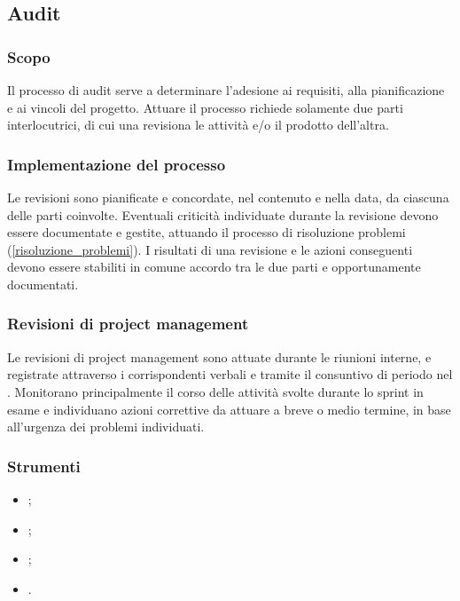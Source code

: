 \subsection{Audit}\label{audit}

\subsubsection{Scopo}
\par Il processo di audit serve a determinare l'adesione ai requisiti, alla pianificazione e ai vincoli del progetto. Attuare il processo richiede solamente due parti interlocutrici, di cui una revisiona le attività e/o il prodotto dell'altra.

\subsubsection{Implementazione del processo}
\par Le revisioni sono pianificate e concordate, nel contenuto e nella data, da ciascuna delle parti coinvolte. Eventuali criticità individuate durante la revisione devono essere documentate e gestite, attuando il processo di risoluzione problemi (\ref{risoluzione_problemi}). I risultati di una revisione e le azioni conseguenti devono essere stabiliti in comune accordo tra le due parti e opportunamente documentati.

\subsubsection{Revisioni di project management}
\par Le revisioni di project management sono attuate durante le riunioni interne, e registrate attraverso i corrispondenti verbali e tramite il consuntivo di periodo nel \PdP. Monitorano principalmente il corso delle attività svolte durante lo sprint in esame e individuano azioni correttive da attuare a breve o medio termine, in base all'urgenza dei problemi individuati.

\subsubsection{Strumenti}
\begin{itemize}
  \item {};
  \item {};
  \item {};
  \item {}.
\end{itemize}